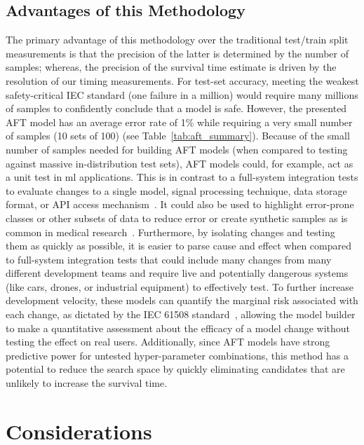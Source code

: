 \documentclass[sn-mathphys-num]{sn-jnl}%
\begin{document}
\subsection{Advantages of this Methodology}
\label{advantages}
The primary advantage of this methodology over the traditional test/train split measurements is that the precision of the latter is determined by the number of samples; whereas, the precision of the survival time estimate is driven by the resolution of our timing measurements.
For test-set accuracy,  meeting the weakest safety-critical IEC standard (one failure in a million) would require many millions of samples to confidently conclude that a model is safe. However, the presented AFT model has an average error rate of 1\% while requiring a very small number of samples (10 sets of 100) (see Table~\ref{tab:aft_summary}).
Because of the small number of samples needed for building AFT models (when compared to testing against massive in-distribution test sets), AFT models could, for example, act as a unit test in \acrshort{ml} applications.
This is in contrast to a full-system integration tests to evaluate changes to a single model, signal processing technique, data storage format, or API access mechanism~\cite{schmoor2000sample,lachin1981introduction}.
It could also be used to highlight error-prone classes or other subsets of data to reduce error or create synthetic samples as is common in medical research~\cite{kleinbaum1996survival}.
Furthermore, by isolating changes and testing them as quickly as possible, it is easier to parse cause and effect when compared to full-system integration tests that could include many changes from many different development teams and require live and potentially dangerous systems (like cars, drones, or industrial equipment) to effectively test.
To further increase development velocity, these models can quantify the marginal risk associated with each change, as dictated by the IEC 61508 standard~\cite{IEC61508}, allowing the model builder to make a quantitative assessment about the efficacy of a model change without testing the effect on real users.
Additionally, since AFT models have strong predictive power for untested hyper-parameter combinations, this method has a potential to reduce the search space by quickly eliminating candidates that are unlikely to increase the survival time.

\section{Considerations}
\label{considerations}
\end{document}
